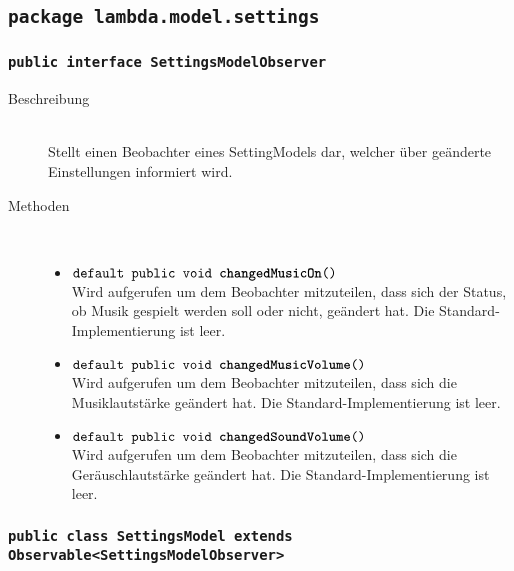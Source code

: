 \subsection{\texttt{package lambda.model.settings}}

\subsubsection{\normalfont \texttt{public interface \textbf{SettingsModelObserver}}}

\begin{description}
\item[Beschreibung] \hfill \\ Stellt einen Beobachter eines SettingModels dar, welcher über geänderte Einstellungen informiert wird.

\item[Methoden] \hfill \\
	\vspace{-.8cm}
	\begin{itemize}
		\item $\texttt{default public void \textbf{changedMusicOn}()}$ \\ Wird aufgerufen um dem Beobachter mitzuteilen, 
		dass sich der Status, ob Musik gespielt werden soll oder nicht, geändert hat. Die Standard-Implementierung ist leer.
		\item $\texttt{default public void \textbf{changedMusicVolume}()}$ \\ Wird aufgerufen um dem Beobachter mitzuteilen, 
		dass sich die Musiklautstärke geändert hat. Die Standard-Implementierung ist leer.
		\item $\texttt{default public void \textbf{changedSoundVolume}()}$ \\ Wird aufgerufen um dem Beobachter mitzuteilen, 
		dass sich die Geräuschlautstärke geändert hat. Die Standard-Implementierung ist leer.
	\end{itemize}
\end{description}

\subsubsection{\normalfont \texttt{public class \textbf{SettingsModel} extends Observable<SettingsModelObserver>}}

